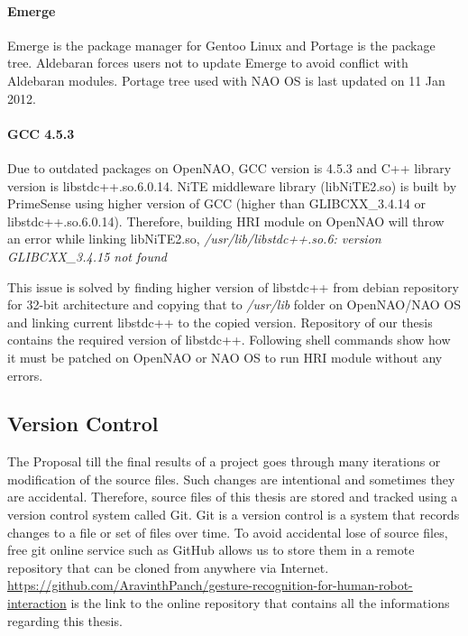 \paragraph*{Emerge} Emerge is the package manager for Gentoo Linux and Portage is the package tree. Aldebaran forces users not to update Emerge to avoid conflict with Aldebaran modules. Portage tree used with NAO OS is last updated on 11 Jan 2012. 

\paragraph*{GCC 4.5.3} Due to outdated packages on OpenNAO, GCC version is 4.5.3 and C++ library version is libstdc++.so.6.0.14. NiTE middleware library (libNiTE2.so) is built by PrimeSense using higher version of GCC (higher than GLIBCXX\_3.4.14 or libstdc++.so.6.0.14). Therefore, building HRI module on OpenNAO will throw an error while linking libNiTE2.so, \textit{/usr/lib/libstdc++.so.6: version GLIBCXX\_3.4.15 not found}

This issue is solved by finding higher version of libstdc++ from debian repository for 32-bit architecture and copying that to \textit{/usr/lib} folder on OpenNAO/NAO OS and linking current libstdc++ to the copied version. Repository of our thesis contains the required version of libstdc++. Following shell commands show how it must be patched on OpenNAO or NAO OS to run HRI module without any errors.



\subsection{Version Control} The Proposal till the final results of a project goes through many iterations or modification of the source files. Such changes are intentional and sometimes they are accidental. Therefore, source files of this thesis are stored and tracked using a version control system called Git. Git is a version control is a system that records changes to a file or set of files over time. To avoid accidental lose of source files, free git online service such as GitHub allows us to store them in a remote repository that can be cloned from anywhere via Internet. \url{https://github.com/AravinthPanch/gesture-recognition-for-human-robot-interaction} is the link to the online repository that contains all the informations regarding this thesis.

